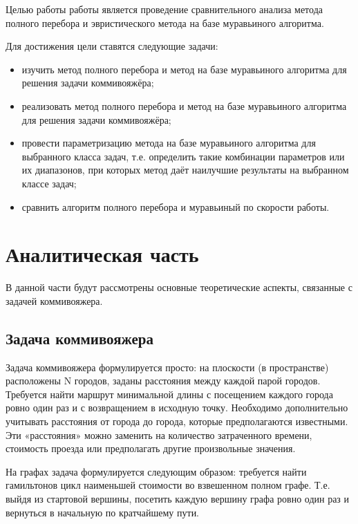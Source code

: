 \documentclass[12pt]{report}
\begin{document}
Целью работы работы является проведение сравнительного анализа метода полного перебора и эвристического метода на базе муравьиного алгоритма.
\newline

Для достижения цели ставятся следующие задачи:
\begin{itemize}
	\item изучить метод полного перебора и метод на базе муравьиного алгоритма для решения задачи коммивояжёра;
	\item реализовать метод полного перебора и метод на базе муравьиного алгоритма для решения задачи коммивояжёра;
	\item провести параметризацию метода на базе муравьиного алгоритма для выбранного класса задач, т.е. определить такие комбинации параметров или их диапазонов, при которых метод даёт наилучшие результаты на выбранном классе задач;
	\item сравнить алгоритм полного перебора и муравьиный по скорости работы.
\end{itemize}

\chapter{Аналитическая часть}

В данной части будут рассмотрены основные теоретические аспекты, связанные с задачей коммивояжера.

\section{Задача коммивояжера}

Задача коммивояжера формулируется просто: на плоскости (в пространстве) расположены N городов, заданы расстояния между каждой парой городов. Требуется найти маршрут минимальной длины с посещением каждого города ровно один раз и с возвращением в исходную точку. Необходимо дополнительно учитывать расстояния от города до города, которые предполагаются известными. Эти «расстояния» можно заменить на количество затраченного времени, стоимость проезда или предполагать другие произвольные значения. 
\newline

На графах задача формулируется следующим образом: требуется найти гамильтонов цикл наименьшей стоимости во взвешенном полном графе. Т.е. выйдя из стартовой вершины, посетить каждую вершину графа ровно один раз и вернуться в начальную по кратчайшему пути.
\newline
\end{document}
